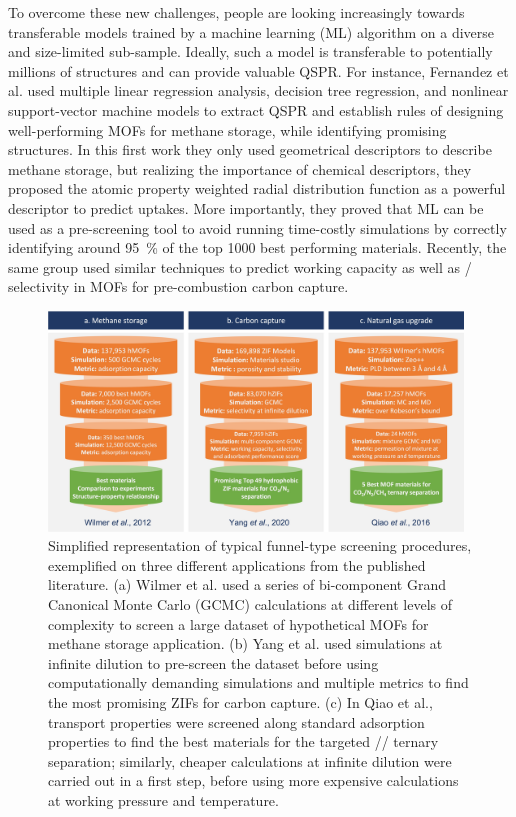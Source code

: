 \documentclass[main.tex]{subfiles}
\begin{document}
To overcome these new challenges, people are looking increasingly towards transferable models trained by a machine learning (ML) algorithm on a diverse and size-limited sub-sample. Ideally, such a model is transferable to potentially millions of structures and can provide valuable QSPR. For instance, Fernandez et al.\cite{Fernandez_2013} used multiple linear regression analysis, decision tree regression, and nonlinear support-vector machine models to extract QSPR and establish rules of designing well-performing MOFs for methane storage, while identifying promising structures. In this first work they only used geometrical descriptors to describe methane storage,\cite{Fernandez_2013} but realizing the importance of chemical descriptors, they proposed the atomic property weighted radial distribution function as a powerful descriptor to predict  uptakes.\cite{Fernandez_2013_rdf} More importantly, they proved that ML can be used as a pre-screening tool to avoid running time-costly simulations by correctly identifying around \SI{95}{\percent} of the top 1000 best performing materials. Recently, the same group used similar techniques to predict  working capacity as well as / selectivity in MOFs for pre-combustion carbon capture.\cite{Dureckova_2019}

\begin{figure}[t]
    \centering
      \includegraphics[width=0.98\textwidth]{figures/1-screening/Screening_procedures.jpg}
      \caption{Simplified representation of typical funnel-type screening procedures, exemplified on three different applications from the published literature. (a) Wilmer et al.\cite{Wilmer_2012} used a series of bi-component Grand Canonical Monte Carlo (GCMC) calculations at different levels of complexity to screen a large dataset of hypothetical MOFs for methane storage application. (b) Yang et al.\cite{Yang_2020} used simulations at infinite dilution to pre-screen the dataset before using computationally demanding simulations and multiple metrics to find the most promising ZIFs for carbon capture. (c) In Qiao et al.\cite{Qiao_2016}, transport properties were screened along standard adsorption properties to find the best materials for the targeted // ternary separation; similarly, cheaper calculations at infinite dilution were carried out in a first step, before using more expensive calculations at working pressure and temperature.}\label{fgr:screening}
    \end{figure}
\end{document}
